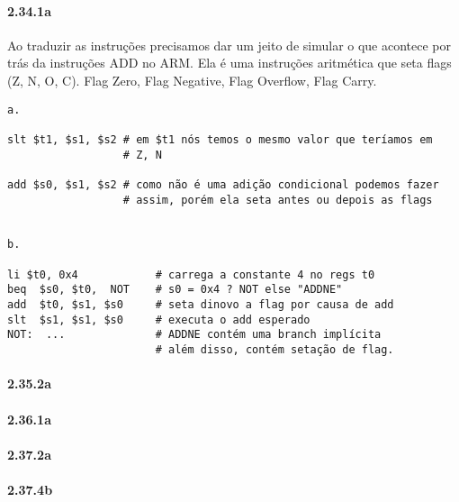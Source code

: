 \documentclass{article}
\begin{document}
\paragraph{2.34.1a}
Ao traduzir as instruções precisamos dar um jeito de simular o que acontece por 
trás da instruções ADD no ARM. Ela é uma instruções aritmética que seta flags 
(Z, N, O, C). Flag Zero, Flag Negative, Flag Overflow, Flag Carry.

\begin{verbatim}
a.

slt $t1, $s1, $s2 # em $t1 nós temos o mesmo valor que teríamos em
                  # Z, N

add $s0, $s1, $s2 # como não é uma adição condicional podemos fazer
                  # assim, porém ela seta antes ou depois as flags


b.

li $t0, 0x4            # carrega a constante 4 no regs t0
beq  $s0, $t0,  NOT    # s0 = 0x4 ? NOT else "ADDNE"
add  $t0, $s1, $s0     # seta dinovo a flag por causa de add
slt  $s1, $s1, $s0     # executa o add esperado
NOT:  ...              # ADDNE contém uma branch implícita
                       # além disso, contém setação de flag.
\end{verbatim}
\paragraph{2.35.2a}
\paragraph{2.36.1a}
\paragraph{2.37.2a}
\paragraph{2.37.4b}
\end{document}
